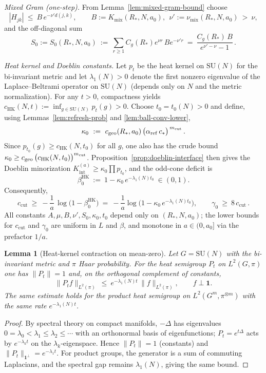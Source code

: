 \documentclass[11pt]{amsart}
\theoremstyle{plain}
\newtheorem{lemma}[theorem]{Lemma}
\theoremstyle{definition}
\theoremstyle{remark}
\begin{document}
\emph{Mixed Gram (one-step).} From Lemma~\ref{lem:mixed-gram-bound} choose
\[
  |H_{jk}|\ \le\ B\,e^{-\nu' d(j,k)},\qquad B:=K_{\mathrm{mix}}(R_*,N,a_0),\ \ \nu':=\nu_{\mathrm{mix}}(R_*,N,a_0)\ >\ \nu,
\]
and the off-diagonal sum
\[
  S_0:=S_0(R_*,N,a_0)\ :=\ \sum_{r\ge 1} C_g(R_*) e^{\nu r}\, B e^{-\nu' r}
   \ =\ \frac{C_g(R_*)\,B}{e^{\nu'-\nu}-1}\,.
\]

\emph{Heat kernel and Doeblin constants.} Let $p_t$ be the heat kernel on $\mathrm{SU}(N)$ for the bi-invariant metric and let $\lambda_1(N)>0$ denote the first nonzero eigenvalue of the Laplace--Beltrami operator on $\mathrm{SU}(N)$ (depends only on $N$ and the metric normalization). For any $t>0$, compactness yields $c_{\mathrm{HK}}(N,t):=\inf_{g\in \mathrm{SU}(N)} p_t(g)>0$. Choose $t_0=t_0(N)>0$ and define, using Lemmas~\ref{lem:refresh-prob} and \ref{lem:ball-conv-lower},
\[
  \kappa_0\ :=\ c_{\mathrm{geo}}(R_*,a_0)\,\bigl(\alpha_{\mathrm{ref}}\,c_*\bigr)^{\,m_{\rm cut}}\,.
\]
Since $p_{t_0}(g)\ge c_{\mathrm{HK}}(N,t_0)$ for all $g$, one also has the crude bound $\kappa_0\ge c_{\mathrm{geo}}\,\bigl(c_{\mathrm{HK}}(N,t_0)\bigr)^{m_{\rm cut}}$. Proposition~\ref{prop:doeblin-interface} then gives the Doeblin minorization $K_{\mathrm{int}}^{(a)}\ge \kappa_0 \prod p_{t_0}$, and the odd-cone deficit is
\[
  \beta_0^{\mathrm{HK}}\ :=\ 1-\kappa_0\,e^{-\lambda_1(N) t_0}\ \in (0,1).
\]
Consequently,
\[
  c_{\mathrm{cut}}\ \ge\ -\frac{1}{a}\,\log\bigl(1-\beta_0^{\mathrm{HK}}\bigr)
   \ =\ -\frac{1}{a}\log\bigl(1-\kappa_0\,e^{-\lambda_1(N) t_0}\bigr),
  \qquad \gamma_0\ \ge\ 8\,c_{\mathrm{cut}}\,.
\]
All constants $A,\mu,B,\nu',S_0,\kappa_0,t_0$ depend only on $(R_*,N,a_0)$; the lower bounds for $c_{\mathrm{cut}}$ and $\gamma_0$ are uniform in $L$ and $\beta$, and monotone in $a\in(0,a_0]$ via the prefactor $1/a$.

\begin{lemma}[Heat-kernel contraction on mean-zero]\label{lem:hk-contraction}
Let $G=\mathrm{SU}(N)$ with the bi-invariant metric and $\pi$ Haar probability. For the heat semigroup $P_t$ on $L^2(G,\pi)$ one has $\|P_t\|=1$ and, on the orthogonal complement of constants,
\[
  \|P_t f\|_{L^2(\pi)}\ \le\ e^{-\lambda_1(N) t}\,\|f\|_{L^2(\pi)},\qquad f\perp \mathbf 1.
\]
The same estimate holds for the product heat semigroup on $L^2(G^m,\pi^{\otimes m})$ with the same rate $e^{-\lambda_1(N) t}$.
\end{lemma}

\begin{proof}
By spectral theory on compact manifolds, $-\Delta$ has eigenvalues $0=\lambda_0<\lambda_1\le\lambda_2\le\cdots$ with an orthonormal basis of eigenfunctions; $P_t=e^{t\Delta}$ acts by $e^{-\lambda_k t}$ on the $\lambda_k$-eigenspace. Hence $\|P_t\|=1$ (constants) and $\|P_t\|_{\mathbf 1^\perp}=e^{-\lambda_1 t}$. For product groups, the generator is a sum of commuting Laplacians, and the spectral gap remains $\lambda_1(N)$, giving the same bound.
\end{proof}
\end{document}
